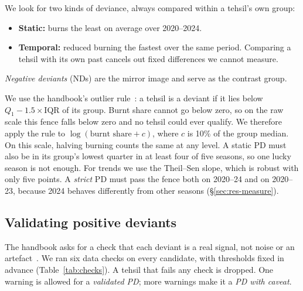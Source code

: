 \documentclass[sigconf,nonacm]{acmart}
\begin{document}
We look for two kinds of deviance, always compared within a tehsil's own group:
\begin{itemize}
  \item \textbf{Static:} burns the least on average over 2020--2024.
  \item \textbf{Temporal:} reduced burning the fastest over the same period. Comparing a tehsil with its own past cancels out fixed differences we cannot measure.
\end{itemize}
\emph{Negative deviants} (NDs) are the mirror image and serve as the contrast group.

We use the handbook's outlier rule~\cite{dppd2021handbook}: a tehsil is a deviant if it lies below $Q_1 - 1.5\times\mathrm{IQR}$ of its group. Burnt share cannot go below zero, so on the raw scale this fence falls below zero and no tehsil could ever qualify. We therefore apply the rule to $\log(\text{burnt share} + c)$, where $c$ is 10\% of the group median. On this scale, halving burning counts the same at any level. A static PD must also be in its group's lowest quarter in at least four of five seasons, so one lucky season is not enough. For trends we use the Theil--Sen slope, which is robust with only five points. A \emph{strict} PD must pass the fence both on 2020--24 and on 2020--23, because 2024 behaves differently from other seasons (\S\ref{sec:res-measure}).

\subsection{Validating positive deviants}
\label{sec:validation}

The handbook asks for a check that each deviant is a real signal, not noise or an artefact~\cite{dppd2021handbook}. We ran six data checks on every candidate, with thresholds fixed in advance (Table~\ref{tab:checks}). A tehsil that fails any check is dropped. One warning is allowed for a \emph{validated PD}; more warnings make it a \emph{PD with caveat}.
\end{document}
